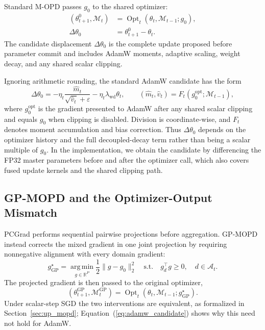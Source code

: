 \documentclass{article}
\begin{document}
Standard M-OPD passes $g_0$ to the shared optimizer:
\begin{equation}
\begin{aligned}
(\theta_{t+1}^{0},\mathcal M_t)
&=\operatorname{Opt}_t(\theta_t,\mathcal M_{t-1};g_0),\\
\Delta\theta_0&=\theta_{t+1}^{0}-\theta_t.
\end{aligned}
\label{eq:up_candidate}
\end{equation}
The candidate displacement $\Delta\theta_0$ is the complete update proposed
before parameter commit and includes AdamW moments, adaptive scaling, weight
decay, and any shared scalar clipping.

Ignoring arithmetic rounding, the standard AdamW candidate has the form
\begin{equation}
\Delta\theta_0
=-\eta_t\frac{\widehat m_t}{\sqrt{\widehat v_t}+\varepsilon}
-\eta_t\lambda_{\mathrm{wd}}\theta_t,
\qquad
(\widehat m_t,\widehat v_t)=F_t(g_0^{\mathrm{opt}};\mathcal M_{t-1}),
\label{eq:adamw_candidate}
\end{equation}
where $g_0^{\mathrm{opt}}$ is the gradient presented to AdamW after any shared
scalar clipping and equals $g_0$ when clipping is disabled. Division is
coordinate-wise, and $F_t$ denotes moment accumulation and bias correction.
Thus $\Delta\theta_0$ depends on the optimizer history and the full
decoupled-decay term rather than being a scalar multiple of $g_0$. In the
implementation, we obtain the candidate by differencing the FP32 master
parameters before and after the optimizer call, which also covers fused update
kernels and the shared clipping path.

\subsection{GP-MOPD and the Optimizer-Output Mismatch}
\label{sec:gp_mopd}

PCGrad performs sequential pairwise projections before aggregation. GP-MOPD
instead corrects the mixed gradient in one joint projection by requiring
nonnegative alignment with every domain gradient:
\begin{equation}
g_{\mathrm{GP}}^\star
=\operatorname*{arg\,min}_{g\in\mathbb R^P}
\frac12\|g-g_0\|_2^2
\quad\text{s.t.}\quad
g_d^\top g\ge0,\quad d\in\mathcal A_t.
\label{eq:gp_projection}
\end{equation}
The projected gradient is then passed to the original optimizer,
\[
(\theta_{t+1}^{\mathrm{GP}},\mathcal M_t^{\mathrm{GP}})
=\operatorname{Opt}_t(\theta_t,\mathcal M_{t-1};g_{\mathrm{GP}}^\star).
\]
Under scalar-step SGD the two interventions are equivalent, as formalized in
Section~\ref{sec:up_mopd}; Equation~(\ref{eq:adamw_candidate}) shows why this
need not hold for AdamW.
\end{document}
